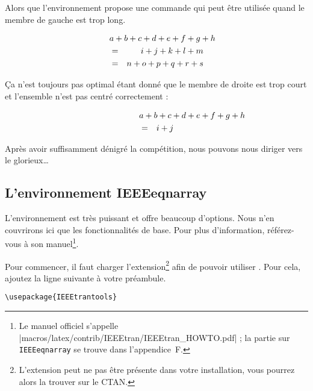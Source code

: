 \noindent Alors que l'environnement propose une commande 
qui peut être utilisée quand le membre de gauche est trop long.
\begin{example}
\begin{eqnarray}
  \lefteqn{a + b + c + d 
    + e + f + g + h}\nonumber\\
  & = & i + j + k + l + m 
  \\
  & = & n + o + p + q + r + s
\end{eqnarray}
\end{example}
\noindent Ça n'est toujours pas optimal étant donné que le membre de droite
est trop court et l'ensemble n'est pas centré correctement :
\begin{example}
\begin{eqnarray}
  \lefteqn{a + b + c + d 
    + e + f + g + h} 
  \nonumber \\
  & = & i + j 
\end{eqnarray}
\end{example}

\noindent Après avoir suffisamment dénigré la compétition, nous
pouvons nous diriger vers le glorieux\ldots

\subsection{L'environnement IEEEeqnarray}
\label{sec:IEEEeqnarray_intro}

L'environnement  est très puissant et offre beaucoup
d'options. Nous n'en couvrirons ici que les fonctionnalités de base. Pour plus
d'information, référez-vous à son manuel\footnote{Le manuel officiel
  s'appelle \CTAN|macros/latex/contrib/IEEEtran/IEEEtran_HOWTO.pdf| ; la partie sur \texttt{IEEEeqnarray}
  se trouve dans l'appendice~F.}.

Pour commencer, il faut charger l'extension\footnote{L'extension
   peut ne pas être présente dans votre
  installation, vous pourrez alors la trouver sur le CTAN.}
 afin de pouvoir utiliser . Pour
cela, ajoutez la ligne suivante à votre préambule.  \small
\begin{verbatim}
\usepackage{IEEEtrantools}
\end{verbatim}
\normalsize

